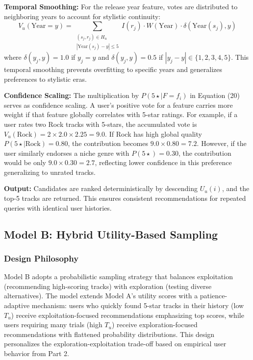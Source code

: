\documentclass[12pt,a4paper]{article}
\begin{document}
\textbf{Temporal Smoothing:} For the release year feature, votes are distributed to neighboring years to account for stylistic continuity:
\begin{equation}
V_u(\text{Year} = y) = \sum_{\substack{(s_j, r_j) \in H_u \\ |\text{Year}(s_j) - y| \leq 5}} I(r_j) \cdot W(\text{Year}) \cdot \delta(\text{Year}(s_j), y)
\end{equation}
where $\delta(y_j, y) = 1.0$ if $y_j = y$ and $\delta(y_j, y) = 0.5$ if $|y_j - y| \in \{1,2,3,4,5\}$. This temporal smoothing prevents overfitting to specific years and generalizes preferences to stylistic eras.

\textbf{Confidence Scaling:} The multiplication by $P(5\star \mid F = f_i)$ in Equation (20) serves as confidence scaling. A user's positive vote for a feature carries more weight if that feature globally correlates with 5-star ratings. For example, if a user rates two Rock tracks with 5-stars, the accumulated vote is $V_u(\text{Rock}) = 2 \times 2.0 \times 2.25 = 9.0$. If Rock has high global quality $P(5\star \mid \text{Rock}) = 0.80$, the contribution becomes $9.0 \times 0.80 = 7.2$. However, if the user similarly endorses a niche genre with $P(5\star) = 0.30$, the contribution would be only $9.0 \times 0.30 = 2.7$, reflecting lower confidence in this preference generalizing to unrated tracks.

\textbf{Output:} Candidates are ranked deterministically by descending $U_u(i)$, and the top-5 tracks are returned. This ensures consistent recommendations for repeated queries with identical user histories.

\subsection{Model B: Hybrid Utility-Based Sampling}

\subsubsection{Design Philosophy}
Model B adopts a probabilistic sampling strategy that balances exploitation (recommending high-scoring tracks) with exploration (testing diverse alternatives). The model extends Model A's utility scores with a patience-adaptive mechanism: users who quickly found 5-star tracks in their history (low $T_u$) receive exploitation-focused recommendations emphasizing top scores, while users requiring many trials (high $T_u$) receive exploration-focused recommendations with flattened probability distributions. This design personalizes the exploration-exploitation trade-off based on empirical user behavior from Part 2.
\end{document}
